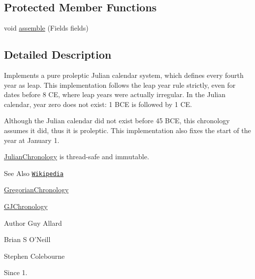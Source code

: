 \subsection*{Protected Member Functions}
\begin{DoxyCompactItemize}
\item 
void \hyperlink{classorg_1_1joda_1_1time_1_1chrono_1_1_julian_chronology_aed07f39bc1c1ef437ba6c713e2123ee4}{assemble} (Fields fields)
\end{DoxyCompactItemize}


\subsection{Detailed Description}
Implements a pure proleptic Julian calendar system, which defines every fourth year as leap. This implementation follows the leap year rule strictly, even for dates before 8 C\-E, where leap years were actually irregular. In the Julian calendar, year zero does not exist\-: 1 B\-C\-E is followed by 1 C\-E. 

Although the Julian calendar did not exist before 45 B\-C\-E, this chronology assumes it did, thus it is proleptic. This implementation also fixes the start of the year at January 1. 

\hyperlink{classorg_1_1joda_1_1time_1_1chrono_1_1_julian_chronology}{Julian\-Chronology} is thread-\/safe and immutable.

\begin{DoxySeeAlso}{See Also}
\href{http://en.wikipedia.org/wiki/Julian_calendar}{\tt Wikipedia} 

\hyperlink{classorg_1_1joda_1_1time_1_1chrono_1_1_gregorian_chronology}{Gregorian\-Chronology} 

\hyperlink{classorg_1_1joda_1_1time_1_1chrono_1_1_g_j_chronology}{G\-J\-Chronology}
\end{DoxySeeAlso}
\begin{DoxyAuthor}{Author}
Guy Allard 

Brian S O'Neill 

Stephen Colebourne 
\end{DoxyAuthor}
\begin{DoxySince}{Since}
1. 
\end{DoxySince}


